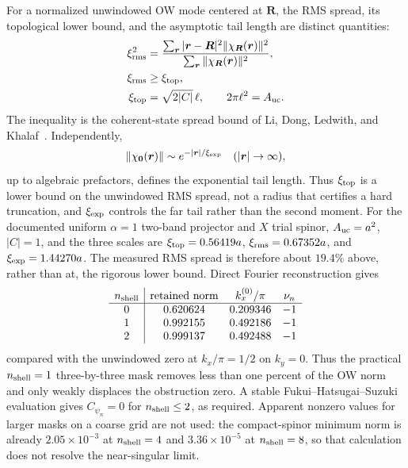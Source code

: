 \documentclass[aps,prb,twocolumn,floatfix,nofootinbib,superscriptaddress]{revtex4-2}
\begin{document}
For a normalized unwindowed OW mode centered at $\boldsymbol R$, the RMS spread, its
topological lower bound, and the asymptotic tail length are distinct quantities:
\begin{align}
 \xi_{\rm rms}^2
 &=\frac{\sum_{\boldsymbol r}|\boldsymbol r-\boldsymbol R|^2
 \|\chi_{\boldsymbol R}(\boldsymbol r)\|^2}
 {\sum_{\boldsymbol r}\|\chi_{\boldsymbol R}(\boldsymbol r)\|^2},\nonumber\\
 \xi_{\rm rms}&\geq\xi_{\rm top},\nonumber\\
 \xi_{\rm top}&=\sqrt{2|C|}\,\ell,
 \qquad 2\pi\ell^2=A_{\rm uc}.
 \label{eq:ow-localization-scales}
\end{align}
The inequality is the coherent-state spread bound of
Li, Dong, Ledwith, and Khalaf~\cite{LiDongLedwithKhalaf2024}.  Independently,
\begin{equation}
 \|\chi_{\boldsymbol 0}(\boldsymbol r)\|
 \sim e^{-|\boldsymbol r|/\xi_{\rm exp}}
 \quad (|\boldsymbol r|\to\infty),
 \label{eq:ow-exponential-length}
\end{equation}
up to algebraic prefactors, defines the exponential tail length.  Thus
$\xi_{\rm top}$ is a lower bound on the unwindowed RMS spread, not a radius that certifies
a hard truncation, and $\xi_{\rm exp}$ controls the far tail rather than the second
moment.  For the documented uniform $\alpha=1$ two-band projector and $X$ trial spinor,
$A_{\rm uc}=a^2$, $|C|=1$, and the three scales are
$\xi_{\rm top}=0.56419a$, $\xi_{\rm rms}=0.67352a$, and
$\xi_{\rm exp}=1.44270a$.  The measured RMS spread is therefore about $19.4\%$ above,
rather than at, the rigorous lower bound.  Direct Fourier reconstruction gives
\begin{equation}
\begin{array}{c|ccc}
n_{\rm shell} & \text{retained norm} & k_x^{(0)}/\pi & \nu_n\\ \hline
0 & 0.620624 & 0.209346 & -1\\
1 & 0.992155 & 0.492186 & -1\\
2 & 0.999137 & 0.492488 & -1
\end{array}
\label{eq:legacy-windowed-values}
\end{equation}
compared with the unwindowed zero at $k_x/\pi=1/2$ on $k_y=0$.  Thus the practical
$n_{\rm shell}=1$ three-by-three mask removes less than one percent of the OW norm and
only weakly displaces the obstruction zero.  A stable Fukui--Hatsugai--Suzuki evaluation
gives $C_{\psi_n}=0$ for $n_{\rm shell}\leq2$, as required.  Apparent nonzero values for
larger masks on a coarse grid are not used: the compact-spinor minimum norm is already
$2.05\times10^{-3}$ at $n_{\rm shell}=4$ and $3.36\times10^{-5}$ at
$n_{\rm shell}=8$, so that calculation does not resolve the near-singular limit.
\end{document}
